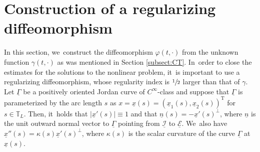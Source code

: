 \documentclass[11pt]{article}
\newcommand{\cI}{{\mathcal I}}
\newcommand{\cE}{{\mathcal E}}
\newcommand{\ul}[1]{\underline{#1}}
\newcommand{\itGamma}{\mathit{\Gamma}}
\theoremstyle{definition}
\begin{document}
\section{Construction of a regularizing diffeomorphism}\label{sect:diffeo}
In this section, we~construct the diffeomorphism $\varphi(t,\cdot)$ from the unknown function $\gamma(t,\cdot)$ as was mentioned in Section \ref{subsect:CT}. In~order to close the estimates for the solutions to the nonlinear problem, it~is important to use a regularizing diffeomorphism, whose regularity index is
$\sfrac12$ larger than that of $\gamma$.
Let $\ul{\itGamma}$ be a positively oriented Jordan curve of $C^\infty$-class and suppose that $\ul{\itGamma}$ is parameterized by the arc length $s$ as
$x = \ul{x}(s) = (\ul{x}_1(s),\ul{x}_2(s))^\mathrm{T}$ for $s \in \mathbb{T}_L$.
Then, it~holds that $|\ul{x}'(s)| \equiv 1$ and that $\ul{n}(s)=-\ul{x}'(s)^\perp$, where $\ul{n}$ is the unit outward normal vector to $\ul{\itGamma}$
pointing from $\ul{\cI}$ to $\ul{\cE}$. We~also have $\ul{x}''(s)=\kappa(s)\ul{x}'(s)^\perp$, where $\kappa(s)$ is the scalar curvature of the curve $\ul{\itGamma}$ at $\ul{x}(s)$.
\end{document}
